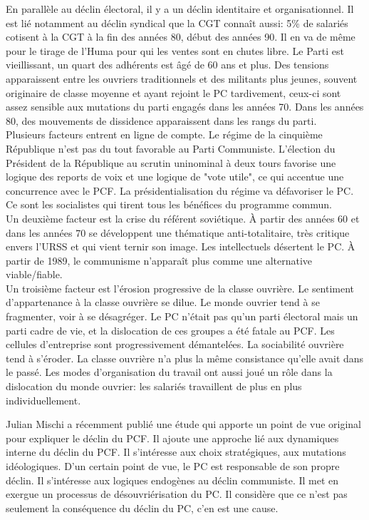 \documentclass[10pt, a4paper, openany]{book}
\begin{document}
En parallèle au déclin électoral, il y a un déclin identitaire et organisationnel. Il est lié notamment au déclin syndical que la CGT connaît aussi: 5\% de salariés cotisent à la CGT à la fin des années 80, début des années 90. Il en va de même pour le tirage de l'Huma pour qui les ventes sont en chutes libre. Le Parti est vieillissant, un quart des adhérents est âgé de 60 ans et plus. Des tensions apparaissent entre les ouvriers traditionnels et des militants plus jeunes, souvent originaire de classe moyenne et ayant rejoint le PC tardivement, ceux-ci sont assez sensible aux mutations du parti engagés dans les années 70. Dans les années 80, des mouvements de dissidence apparaissent dans les rangs du parti. \\
Plusieurs facteurs entrent en ligne de compte. Le régime de la cinquième République n'est pas du tout favorable au Parti Communiste. L'élection du Président de la République au scrutin uninominal à deux tours favorise une logique des reports de voix et une logique de "vote utile", ce qui accentue une concurrence avec le PCF. La présidentialisation du régime va défavoriser le PC. Ce sont les socialistes qui tirent tous les bénéfices du programme commun. \\
Un deuxième facteur est la crise du référent soviétique. À partir des années 60 et dans les années 70 se développent une thématique anti-totalitaire, très critique envers l'URSS et qui vient ternir son image. Les intellectuels désertent le PC. À partir de 1989, le communisme n'apparaît plus comme une alternative viable/fiable. \\
Un troisième facteur est l'érosion progressive de la classe ouvrière. Le sentiment d'appartenance à la classe ouvrière se dilue. Le monde ouvrier tend à se fragmenter, voir à se désagréger. Le PC n'était pas qu'un parti électoral mais un parti cadre de vie, et la dislocation de ces groupes a été fatale au PCF. Les cellules d'entreprise sont progressivement démantelées. La sociabilité ouvrière tend à s'éroder. La classe ouvrière n'a plus la même consistance qu'elle avait dans le passé. Les modes d'organisation du travail ont aussi joué un rôle dans la dislocation du monde ouvrier: les salariés travaillent de plus en plus individuellement.


Julian Mischi a récemment publié une étude qui apporte un point de vue original pour expliquer le déclin du PCF. Il ajoute une approche lié aux dynamiques interne du déclin du PCF. Il s'intéresse aux choix stratégiques, aux mutations idéologiques. D'un certain point de vue, le PC est responsable de son propre déclin. Il s'intéresse aux logiques endogènes au déclin communiste. Il met en exergue un processus de désouvriérisation du PC. Il considère que ce n'est pas seulement la conséquence du déclin du PC, c'en est une cause. 
\end{document}
